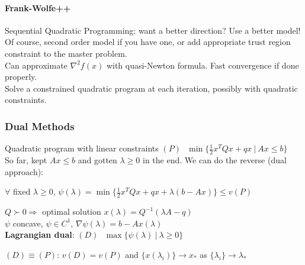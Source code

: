 \documentclass[10pt]{report}
\begin{document}
\paragraph{Frank-Wolfe++} Sequential Quadratic Programming: want a better direction? Use a better model! Of course, second order model if you have one, or add appropriate trust region constraint to the master problem.\\
Can approximate $\nabla^2 f(x)$ with quasi-Newton formula. Fast convergence if done properly.\\
Solve a constrained quadratic program at each iteration, possibly with quadratic constraints.
\subsubsection{Dual Methods}
Quadratic program with linear constraints $(P)\:\:\:\min\{\frac{1}{2}x^TQx+qx\:|\:Ax\leq b\}$\\
So far, kept $Ax\leq b$ and gotten $\lambda \geq 0$ in the end. We can do the reverse (dual approach): \begin{list}{}{}
	\item $\forall$ fixed $\lambda\geq 0$, $\psi(\lambda)=\min\{\frac{1}{2}x^TQx + qx + \lambda(b-Ax)\}\leq v(P)$
\end{list}
$Q\succ 0\Rightarrow$ optimal solution $x(\lambda)=Q^{-1}(\lambda A-q)$\\
$\psi$ concave, $\psi\in C^1$, $\nabla\psi(\lambda)=b-Ax(\lambda)$\\
\textbf{Lagrangian dual}: $(D)\:\:\:\max\{\psi(\lambda)\:|\:\lambda\geq 0\}$
\begin{list}{}{}
	\item $(D)\equiv (P)$: $v(D) = v(P)$ and $\{x(\lambda_i)\}\rightarrow x_*$ as $\{\lambda_i\}\rightarrow \lambda_*$
\end{list}
\end{document}
